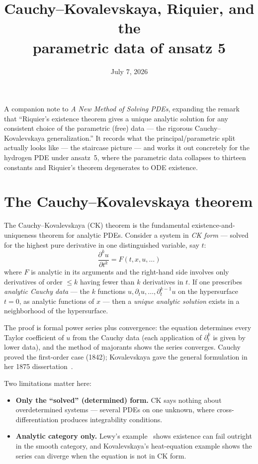 \documentclass[11pt]{article}
\title{Cauchy--Kovalevskaya, Riquier, and the\\ parametric data of ansatz 5}
\author{}
\date{July 7, 2026}
\begin{document}
\maketitle

\noindent
A companion note to \emph{A New Method of Solving PDEs}, expanding the
remark that ``Riquier's existence theorem gives a unique analytic solution
for any consistent choice of the parametric (free) data --- the rigorous
Cauchy--Kovalevskaya generalization.''  It records what the
principal/parametric split actually looks like --- the staircase picture ---
and works it out concretely for the hydrogen PDE under ansatz~5, where the
parametric data collapses to thirteen constants and Riquier's theorem
degenerates to ODE existence.

\section{The Cauchy--Kovalevskaya theorem}

The Cauchy--Kovalevskaya (CK) theorem is the fundamental
existence-and-uniqueness theorem for analytic PDEs.  Consider a system in
\emph{CK form} --- solved for the highest pure derivative in one
distinguished variable, say $t$:
\begin{equation*}
\frac{\partial^k u}{\partial t^k} = F(t, x, u, \ldots)
\end{equation*}
where $F$ is analytic in its arguments and the right-hand side involves
only derivatives of order $\le k$ having fewer than $k$ derivatives in
$t$.  If one prescribes \emph{analytic Cauchy data} --- the $k$ functions
$u, \partial_t u, \ldots, \partial_t^{k-1}u$ on the hypersurface $t=0$, as
analytic functions of $x$ --- then a \emph{unique analytic solution}
exists in a neighborhood of the hypersurface.

The proof is formal power series plus convergence: the equation determines
every Taylor coefficient of $u$ from the Cauchy data (each application of
$\partial_t^k$ is given by lower data), and the method of majorants shows
the series converges.  Cauchy proved the first-order case (1842);
Kovalevskaya gave the general formulation in her 1875
dissertation~\cite{kowalevsky}.

Two limitations matter here:
\begin{itemize}
\item \textbf{Only the ``solved'' (determined) form.}  CK says nothing
  about overdetermined systems --- several PDEs on one unknown, where
  cross-differentiation produces integrability conditions.
\item \textbf{Analytic category only.}  Lewy's example~\cite{lewy} shows
  existence can fail outright in the smooth category, and Kovalevskaya's
  heat-equation example shows the series can diverge when the equation is
  not in CK form.
\end{itemize}
\end{document}
